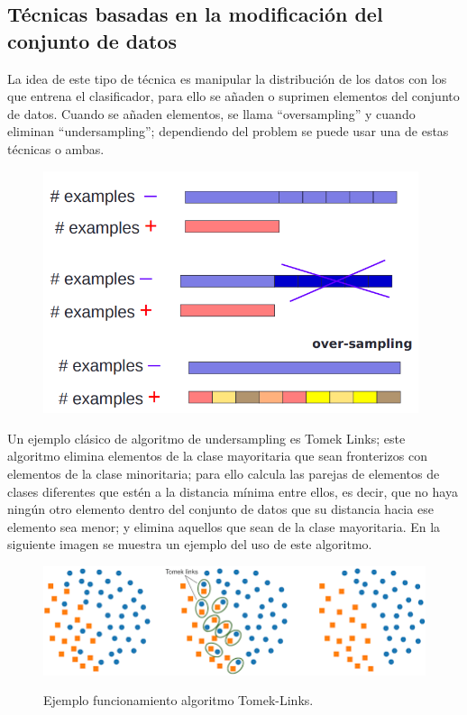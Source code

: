 \subsection{Técnicas basadas en la modificación del conjunto de datos}
La idea de este tipo de técnica es manipular la distribución de los datos con los que entrena el clasificador, para ello se añaden o suprimen elementos del conjunto de datos. Cuando se añaden elementos, se llama “oversampling” y cuando eliminan “undersampling”; dependiendo del problem se puede usar una de estas técnicas o ambas.\newline
\newpage
\begin{figure}[h]
	\centering
	\includegraphics[width=110mm]{imagenes/oversampling_undersampling.png}
	\label{fig:27}
\end{figure}
\verticalspace

Un ejemplo clásico de algoritmo de undersampling es Tomek Links; este algoritmo elimina elementos de la clase mayoritaria que sean fronterizos con elementos de la clase minoritaria; para ello calcula las parejas de elementos de clases diferentes que estén a la distancia mínima entre ellos, es decir, que no haya ningún otro elemento dentro del conjunto de datos que su distancia hacia ese elemento sea menor; y elimina aquellos que sean de la clase mayoritaria. En la siguiente imagen se muestra un ejemplo del uso de este algoritmo.\newline


\begin{figure}[h]
	\centering
	\includegraphics[width=120mm]{imagenes/tomek-example.png}
	\label{fig:28}
	\caption{Ejemplo funcionamiento algoritmo Tomek-Links.}
\end{figure}
\verticalspace

